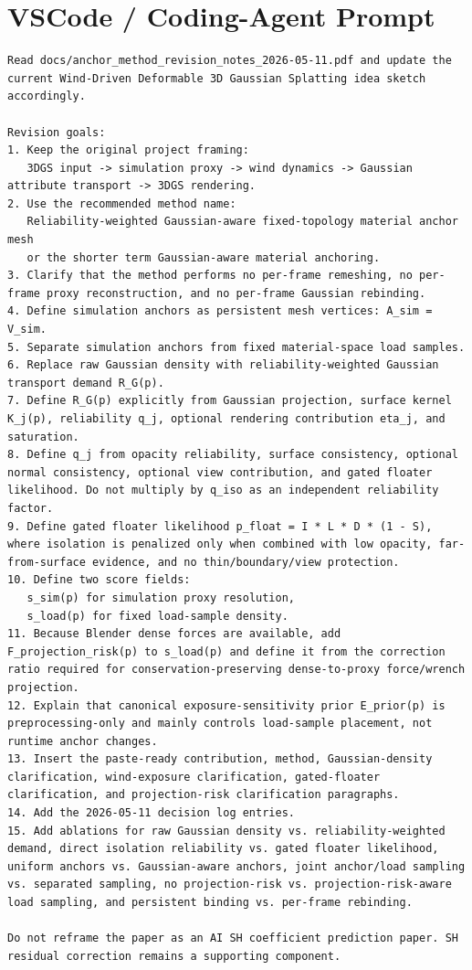 \documentclass[11pt,a4paper]{article}
\begin{document}
\section{VSCode / Coding-Agent Prompt}

\begin{lstlisting}
Read docs/anchor_method_revision_notes_2026-05-11.pdf and update the current Wind-Driven Deformable 3D Gaussian Splatting idea sketch accordingly.

Revision goals:
1. Keep the original project framing:
   3DGS input -> simulation proxy -> wind dynamics -> Gaussian attribute transport -> 3DGS rendering.
2. Use the recommended method name:
   Reliability-weighted Gaussian-aware fixed-topology material anchor mesh
   or the shorter term Gaussian-aware material anchoring.
3. Clarify that the method performs no per-frame remeshing, no per-frame proxy reconstruction, and no per-frame Gaussian rebinding.
4. Define simulation anchors as persistent mesh vertices: A_sim = V_sim.
5. Separate simulation anchors from fixed material-space load samples.
6. Replace raw Gaussian density with reliability-weighted Gaussian transport demand R_G(p).
7. Define R_G(p) explicitly from Gaussian projection, surface kernel K_j(p), reliability q_j, optional rendering contribution eta_j, and saturation.
8. Define q_j from opacity reliability, surface consistency, optional normal consistency, optional view contribution, and gated floater likelihood. Do not multiply by q_iso as an independent reliability factor.
9. Define gated floater likelihood p_float = I * L * D * (1 - S), where isolation is penalized only when combined with low opacity, far-from-surface evidence, and no thin/boundary/view protection.
10. Define two score fields:
   s_sim(p) for simulation proxy resolution,
   s_load(p) for fixed load-sample density.
11. Because Blender dense forces are available, add F_projection_risk(p) to s_load(p) and define it from the correction ratio required for conservation-preserving dense-to-proxy force/wrench projection.
12. Explain that canonical exposure-sensitivity prior E_prior(p) is preprocessing-only and mainly controls load-sample placement, not runtime anchor changes.
13. Insert the paste-ready contribution, method, Gaussian-density clarification, wind-exposure clarification, gated-floater clarification, and projection-risk clarification paragraphs.
14. Add the 2026-05-11 decision log entries.
15. Add ablations for raw Gaussian density vs. reliability-weighted demand, direct isolation reliability vs. gated floater likelihood, uniform anchors vs. Gaussian-aware anchors, joint anchor/load sampling vs. separated sampling, no projection-risk vs. projection-risk-aware load sampling, and persistent binding vs. per-frame rebinding.

Do not reframe the paper as an AI SH coefficient prediction paper. SH residual correction remains a supporting component.
\end{lstlisting}
\end{document}
